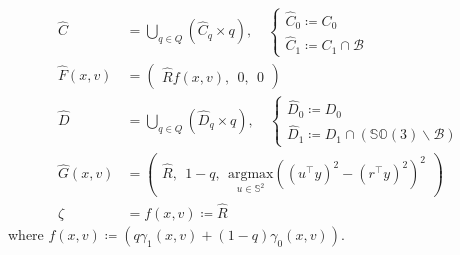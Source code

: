 \documentclass{article}
\newcommand{\SOthree}{\mathbb{SO}(3)}
\newcommand{\brackets}[1]{\left(#1\right)}
\newcommand{\textblue}[1]{\textcolor{blue}{#1}}
\begin{document}
\begin{subequations}\label{eq:hybrid_PCF}
\begin{align} 
    \hat{C} &= \bigcup_{q\in Q}\brackets{\hat{C}_{q}\times q}, \quad \begin{cases}
        \hat{C}_{0} \coloneqq C_0\\
        \hat{C}_{1} \coloneqq C_1 \cap \mathcal{B}
    \end{cases}\\
    \hat{F}(x, v) &= \begin{pmatrix}
        \hat{R}f(x,v), \:\: 0, \:\: 0
    \end{pmatrix}\label{eq:13b}\\
    \hat{D} &= \bigcup_{q\in Q} \brackets{\hat{D}_{q}\times q}, \quad \begin{cases}
        \hat{D}_{0} \coloneqq D_0\\
        \hat{D}_{1} \coloneqq D_1 \cap (\SOthree \backslash \mathcal{B})
    \end{cases}\\
    \hat{G}(x, v) &= \begin{pmatrix}
        \hat{R}, \:\: 1-q,\:\: \underset{u\in\mathbb{S}^2}{\mathrm{argmax}}\left((u^\top y)^2 - (r^\top y)^2\right)^2
    \end{pmatrix}\\
    \zeta &= f(x,v)\coloneqq \hat{R} \label{eq:output_hybrid}
\end{align}
\end{subequations}
where $f(x,v)\coloneqq \left(q\gamma_1(x,v) + (1-q)\gamma_0(x,v)\right)$. 



\end{document}
